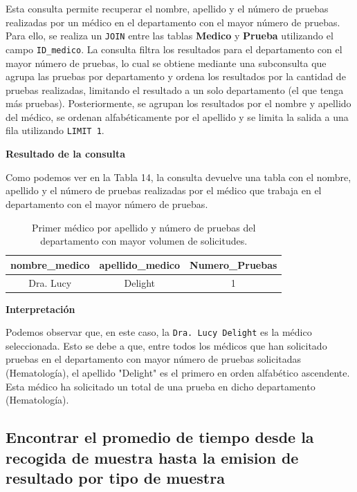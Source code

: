 \documentclass[spanish]{article}
\begin{document}
Esta consulta permite recuperar el nombre, apellido y el número de pruebas realizadas por un médico en el departamento con el mayor número de pruebas. Para ello, se realiza un \texttt{JOIN} entre las tablas \textbf{Medico} y \textbf{Prueba} utilizando el campo \texttt{ID\_medico}. La consulta filtra los resultados para el departamento con el mayor número de pruebas, lo cual se obtiene mediante una subconsulta que agrupa las pruebas por departamento y ordena los resultados por la cantidad de pruebas realizadas, limitando el resultado a un solo departamento (el que tenga más pruebas). Posteriormente, se agrupan los resultados por el nombre y apellido del médico, se ordenan alfabéticamente por el apellido y se limita la salida a una fila utilizando \texttt{LIMIT 1}.

\newpage
\textbf{Resultado de la consulta}

Como podemos ver en la Tabla 14, la consulta devuelve una tabla con el nombre, apellido y el número de pruebas realizadas por el médico que trabaja en el departamento con el mayor número de pruebas.

\begin{table}[h!]
\centering
\begin{tabular}{|c|c|c|}
\hline
\textbf{nombre\_medico} & \textbf{apellido\_medico} & \textbf{Numero\_Pruebas} \\
\hline
Dra. Lucy & Delight & 1 \\
\hline
\end{tabular}
\caption{Primer médico por apellido y número de pruebas del departamento con mayor volumen de solicitudes.}
\label{tab:historial_prueba}
\end{table}

\textbf{Interpretación}

Podemos observar que, en este caso, la \texttt{Dra. Lucy Delight} es la médico seleccionada. Esto se debe a que, entre todos los médicos que han solicitado pruebas en el departamento con mayor número de pruebas solicitadas (Hematología), el apellido "Delight" es el primero en orden alfabético ascendente. Esta médico ha solicitado un total de una prueba en dicho departamento (Hematología).



\subsection{Encontrar el promedio de tiempo desde la recogida de muestra hasta la emision de resultado por tipo de muestra}
\end{document}
